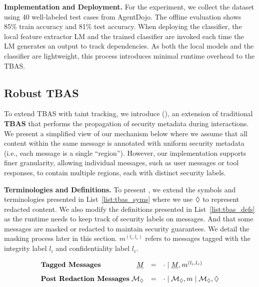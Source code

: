 \textbf{Implementation and Deployment.} For the experiment, we collect the dataset using 40 well-labeled test cases from AgentDojo. The offline evaluation shows 85\% train accuracy and 81\% test accuracy. When deploying the classifier, the local feature extractor LM and the trained classifier are invoked each time the LM generates an output to track dependencies. As both the local models and the classifier are lightweight, this process introduces minimal runtime overhead to the TBAS.














\subsection{Robust TBAS}
To extend TBAS with taint tracking, we introduce \textbf{\sysnamelong} (\sysname), an extension of traditional \textbf{TBAS} that performs the propagation of security metadata during interactions. We present a simplified view of our mechanism below where we assume that all content within the same message is annotated with uniform security metadata (i.e., each message is a single “region”). However, our implementation supports finer granularity, allowing individual messages, such as user messages or tool responses, to contain multiple regions, each with distinct security labels.

\textbf{Terminologies and Definitions.}
To present \sysname, we extend the symbols and terminologies presented in List~\ref{list:tbas_syms} where we use $\lozenge$ to represent redacted content. 
We also modify the definitions presented in List~\ref{list:tbas_defs} as the runtime needs to keep track of security labels on messages. And that some messages are masked or redacted to maintain security guarantees. We detail the masking process later in this section. $m^{(l_i, l_c)}$ refers to messages tagged with the integrity label $l_i$ and confidentiality label $l_c$. 

{
\setlength{\abovedisplayskip}{2pt}
\setlength{\belowdisplayskip}{2pt}
\begin{equation*}
\begin{array}{l@{\;}rcl}
\textbf{Tagged Messages} & \underline{M} & = & \cdot \mid  \underline{M}, m^{(l_i, l_c)} \\[8pt]
\textbf{Post Redaction Messages} & \mathcal{M}_{\redacted} & = & \cdot \mid \mathcal{M}_{\redacted}, m  \mid  \mathcal{M}_{\redacted}, \redacted 
\end{array}
\end{equation*}
}

